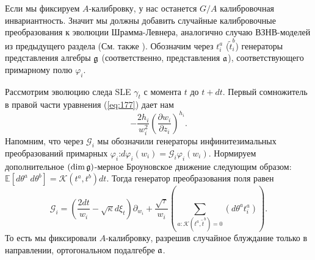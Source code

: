Если мы фиксируем  $A$-калибровку, у нас останется  $G/A$ калибровочная инвариантность. Значит мы должны добавить случайные калибровочные преобразования к эволюции Шрамма-Левнера, аналогично случаю ВЗНВ-моделей из предыдущего раздела (См. также \cite{bettelheim2005stochastic}).  Обозначим через $t^{a}_{i}$ ($\tilde{t}^{b}_{i}$) генераторы представления алгебры $\mathfrak{g}$ (соответственно, представления $\mathfrak{a}$), соответствующего примарному полю $\varphi_{i}$.

Рассмотрим эволюцию следа SLE $\gamma_{t}$ с момента   $t$ до $t+ dt$.  Первый сомножитель в правой части уравнения (\ref{eq:177}) дает нам
\begin{equation*}
  -\frac{2h_{i}}{w_{i}^{2}}\left(\frac{\partial w_{i}}{\partial z_{i}}\right)^{h_{i}}.
\end{equation*}
Напомним, что через  $\mathcal{G}_{i}$ мы обозначили  генераторы инфинитезимальных преобразований примарных $\varphi_{i}$:$d\varphi_{i}(w_{i}) = \mathcal{G}_{i}\varphi_{i}(w_{i})$. Нормируем дополнительное $\left(\dim\mathfrak{g}\right)$-мерное Броуновское движение следующим образом: $\mathbb  {E}\left[d\theta^{a}\; d\theta^{b}\right]=\mathcal{K}(t^{a},t^{b})dt$. Тогда генератор преобразования поля равен
\begin{equation}
  \mathcal{G}_{i}=\left(\frac{2dt}{w_{i}}-\sqrt{\kappa} d\xi_{t}\right) \partial_{w_{i}}+\frac{\sqrt{\tau}}{w_{i}}\left(\sum_{a:\mathcal{K}(t^{a},\tilde{t}^{b})=0}\left(d \theta ^{a} t^{a}_{i}\right)\right).
\label{eq:179}
\end{equation}
То есть мы фиксировали  $A$-калибровку, разрешив случайное блуждание только в направлении, ортогональном подалгебре $\mathfrak{a}$. 


